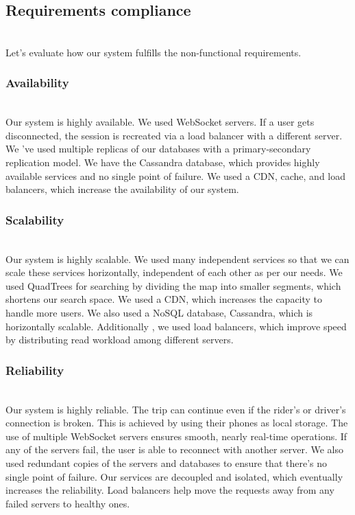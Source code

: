 

\subsection{Requirements compliance}\label{yfkqxSx9PD34Rv9X9WJZQ}
\\
Let's evaluate how our system fulfills the non-functional requirements.

\subsubsection{Availability}\label{RDq-P3iyGAgBKNsaPN-nW}
\\
Our system is highly available. We used WebSocket servers. If a user gets disconnected, the session is recreated via a load balancer with a different server. We 've used multiple replicas of our databases with a primary-secondary replication model. We have the Cassandra database, which provides highly available services and no single point of failure. We used a CDN, cache, and load balancers, which increase the availability of our system.

\subsubsection{Scalability}\label{ZYCS7caUoBuqdZ9zNE1uI}
\\
Our system is highly scalable. We used many independent services so that we can scale these services horizontally, independent of each other as per our needs. We used QuadTrees for searching by dividing the map into smaller segments, which shortens our search space. We used a CDN, which increases the capacity to handle more users. We also used a NoSQL database, Cassandra, which is horizontally scalable. Additionally , we used load balancers, which improve speed by distributing read workload among different servers.

\subsubsection{Reliability}\label{VrU6Azps26Eb7_elnU6_p}
\\
Our system is highly reliable. The trip can continue even if the rider's or driver's connection is broken. This is achieved by using their phones as local storage. The use of multiple WebSocket servers ensures smooth, nearly real-time operations. If any of the servers fail, the user is able to reconnect with another server. We also used redundant copies of the servers and databases to ensure that there's no single point of failure. Our services are decoupled and isolated, which eventually increases the reliability. Load balancers help move the requests away from any failed servers to healthy ones.


